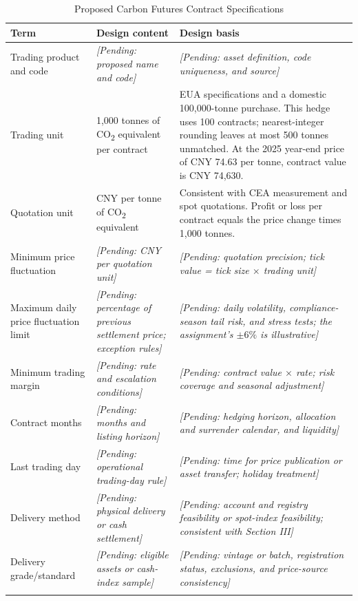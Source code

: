 \documentclass[10pt,a4paper,twocolumn]{article}
\renewcommand{\arraystretch}{1.08}
\newcommand{\pending}[1]{\textcolor{draftgray}{\textit{[Pending: #1]}}}
\begin{document}
\begin{table}[!t]
\centering
\caption{Proposed Carbon Futures Contract Specifications}
\label{tab:terms}
\small
\setlength{\tabcolsep}{5pt}
\renewcommand{\arraystretch}{1.12}
\begin{tabularx}{\textwidth}{@{}L{0.225\textwidth}L{0.27\textwidth}>{\raggedright\arraybackslash}X@{}}
\toprule
\textbf{Term} & \textbf{Design content} & \textbf{Design basis}\\
\midrule
Trading product and code & \pending{proposed name and code} & \pending{asset definition, code uniqueness, and source}\\
\addlinespace[2pt]
Trading unit & 1,000 tonnes of CO\textsubscript{2} equivalent per contract & EUA specifications and a domestic 100,000-tonne purchase\cite{iceEuaSpecs,sinopec2021bulk}. This hedge uses 100 contracts; nearest-integer rounding leaves at most 500 tonnes unmatched. At the 2025 year-end price of CNY 74.63 per tonne\cite{mee2026}, contract value is CNY 74,630.\\
\addlinespace[2pt]
Quotation unit & CNY per tonne of CO\textsubscript{2} equivalent & Consistent with CEA measurement\cite{state2024} and spot quotations\cite{she2025daily}. Profit or loss per contract equals the price change times 1,000 tonnes.\\
\addlinespace[2pt]
Minimum price fluctuation & \pending{CNY per quotation unit} & \pending{quotation precision; tick value = tick size $\times$ trading unit}\\
\addlinespace[2pt]
Maximum daily price fluctuation limit & \pending{percentage of previous settlement price; exception rules} & \pending{daily volatility, compliance-season tail risk, and stress tests; the assignment's $\pm6\%$ is illustrative}\\
\addlinespace[2pt]
Minimum trading margin & \pending{rate and escalation conditions} & \pending{contract value $\times$ rate; risk coverage and seasonal adjustment}\\
\addlinespace[2pt]
Contract months & \pending{months and listing horizon} & \pending{hedging horizon, allocation and surrender calendar, and liquidity}\\
\addlinespace[2pt]
Last trading day & \pending{operational trading-day rule} & \pending{time for price publication or asset transfer; holiday treatment}\\
\addlinespace[2pt]
Delivery method & \pending{physical delivery or cash settlement} & \pending{account and registry feasibility or spot-index feasibility; consistent with Section III}\\
\addlinespace[2pt]
Delivery grade/standard & \pending{eligible assets or cash-index sample} & \pending{vintage or batch, registration status, exclusions, and price-source consistency}\\
\addlinespace[2pt]
\bottomrule
\end{tabularx}
\end{table}
\end{document}
